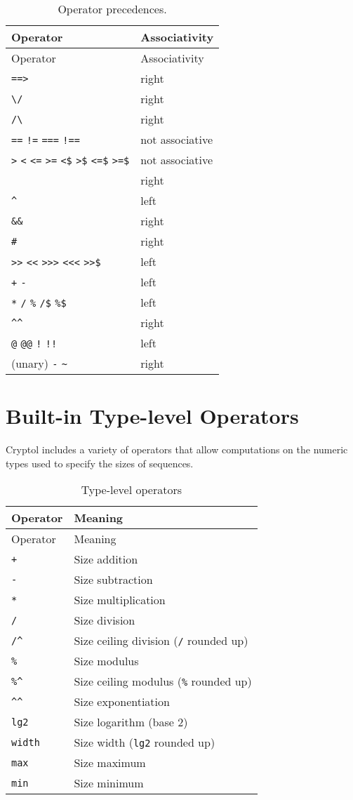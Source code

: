 \begin{longtable}[]{@{}ll@{}}
\caption{Operator precedences.}\tabularnewline
\toprule
Operator & Associativity\tabularnewline
\midrule
\endfirsthead
\toprule
Operator & Associativity\tabularnewline
\midrule
\endhead
\texttt{==\textgreater{}} & right\tabularnewline
\texttt{\textbackslash{}/} & right\tabularnewline
\texttt{/\textbackslash{}} & right\tabularnewline
\texttt{==} \texttt{!=} \texttt{===} \texttt{!==} & not
associative\tabularnewline
\texttt{\textgreater{}} \texttt{\textless{}} \texttt{\textless{}=}
\texttt{\textgreater{}=} \texttt{\textless{}\$}
\texttt{\textgreater{}\$} \texttt{\textless{}=\$}
\texttt{\textgreater{}=\$} & not associative\tabularnewline
\texttt{\textbar{}\textbar{}} & right\tabularnewline
\texttt{\^{}} & left\tabularnewline
\texttt{\&\&} & right\tabularnewline
\texttt{\#} & right\tabularnewline
\texttt{\textgreater{}\textgreater{}} \texttt{\textless{}\textless{}}
\texttt{\textgreater{}\textgreater{}\textgreater{}}
\texttt{\textless{}\textless{}\textless{}}
\texttt{\textgreater{}\textgreater{}\$} & left\tabularnewline
\texttt{+} \texttt{-} & left\tabularnewline
\texttt{*} \texttt{/} \texttt{\%} \texttt{/\$} \texttt{\%\$} &
left\tabularnewline
\texttt{\^{}\^{}} & right\tabularnewline
\texttt{@} \texttt{@@} \texttt{!} \texttt{!!} & left\tabularnewline
(unary) \texttt{-} \texttt{\textasciitilde{}} & right\tabularnewline
\bottomrule
\end{longtable}

\section{Built-in Type-level
Operators}\label{built-in-type-level-operators}

Cryptol includes a variety of operators that allow computations on the
numeric types used to specify the sizes of sequences.

\begin{longtable}[]{@{}ll@{}}
\caption{Type-level operators}\tabularnewline
\toprule
Operator & Meaning\tabularnewline
\midrule
\endfirsthead
\toprule
Operator & Meaning\tabularnewline
\midrule
\endhead
\texttt{+} & Size addition\tabularnewline
\texttt{-} & Size subtraction\tabularnewline
\texttt{*} & Size multiplication\tabularnewline
\texttt{/} & Size division\tabularnewline
\texttt{/\^{}} & Size ceiling division (\texttt{/} rounded
up)\tabularnewline
\texttt{\%} & Size modulus\tabularnewline
\texttt{\%\^{}} & Size ceiling modulus (\texttt{\%} rounded
up)\tabularnewline
\texttt{\^{}\^{}} & Size exponentiation\tabularnewline
\texttt{lg2} & Size logarithm (base 2)\tabularnewline
\texttt{width} & Size width (\texttt{lg2} rounded up)\tabularnewline
\texttt{max} & Size maximum\tabularnewline
\texttt{min} & Size minimum\tabularnewline
\bottomrule
\end{longtable}

